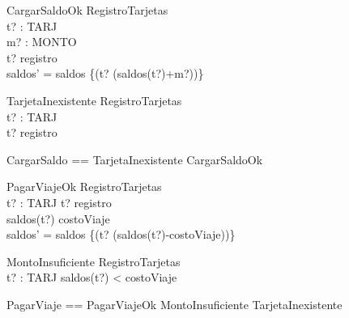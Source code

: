 \begin{schema}{CargarSaldoOk}
    \Delta RegistroTarjetas \\
    t? : TARJ \\
    m? : MONTO \\
\where
    t? \in registro \\
    saldos' = saldos \cup \{(t? \mapsto (saldos(t?)+m?))\} \\
\end{schema}

\begin{schema}{TarjetaInexistente}
    \Xi RegistroTarjetas \\
    t? : TARJ \\
\where
    t? \notin registro \\ 
\end{schema}

\begin{zed}
    CargarSaldo == TarjetaInexistente \lor CargarSaldoOk \\
\end{zed}

\begin{schema}{PagarViajeOk}
    \Delta RegistroTarjetas \\
    t? : TARJ 
\where
    t? \in registro \\
    saldos(t?) \geq costoViaje \\
    saldos' = saldos \cup \{(t? \mapsto (saldos(t?)-costoViaje))\} 
\end{schema}

\begin{schema}{MontoInsuficiente}
    \Xi RegistroTarjetas \\
    t? : TARJ 
\where
    saldos(t?) < costoViaje \\
\end{schema}

\begin{zed}
    PagarViaje == PagarViajeOk \lor MontoInsuficiente \lor TarjetaInexistente \\
\end{zed}
